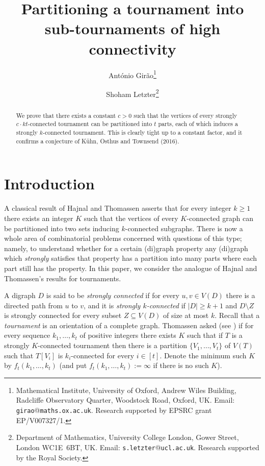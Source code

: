 \documentclass[english]{article}
\title{Partitioning a tournament into sub-tournaments of high connectivity }
\author{Ant\'onio Gir\~ao\thanks{
		Mathematical Institute, 
		University of Oxford,
		Andrew Wiles Building, 
		Radcliffe Observatory Quarter, 
		Woodstock Road,
		Oxford, UK.
		Email: \texttt{girao}@\texttt{maths.ox.ac.uk}.
		Research supported by EPSRC grant EP/V007327/1.
	}
	\and
	Shoham Letzter\thanks{
		Department of Mathematics, 
		University College London, 
		Gower Street, London WC1E~6BT, UK. 
		Email: \texttt{s.letzter}@\texttt{ucl.ac.uk}. 
		Research supported by the Royal Society.   
	}
}
\date{}
\theoremstyle{plain}
\theoremstyle{remark}
\begin{document}
\maketitle

\begin{abstract}
	\setlength{\parskip}{\medskipamount}
    \setlength{\parindent}{0pt}
    \noindent

	We prove that there exists a constant $c > 0$ such that the vertices of every strongly $c \cdot kt$-connected tournament can be partitioned into $t$ parts, each of which induces a strongly $k$-connected tournament. This is clearly tight up to a constant factor, and it confirms a conjecture of K\"uhn, Osthus and Townsend (2016).

\end{abstract}

\section{Introduction}

	A classical result of Hajnal \cite{hajnal1983partition} and Thomassen \cite{thomassen1983graph} asserts that for every integer $k \ge 1$ there exists an integer $K$ such that the vertices of every $K$-connected graph can be partitioned into two sets inducing $k$-connected subgraphs. There is now a whole area of combinatorial problems concerned with questions of this type; namely, to understand whether for a certain (di)graph property any (di)graph which \textit{strongly} satisfies that property has a partition into many parts where each part still has the property. In this paper, we consider the analogue of Hajnal and Thomassen's results for tournaments.

	A digraph $D$ is said to be \emph{strongly connected} if for every $u, v \in V(D)$ there is a directed path from $u$ to $v$, and it is \emph{strongly $k$-connected} if $|D| \ge k+1$ and $D \setminus Z$ is strongly connected for every subset $Z \subseteq V(D)$ of size at most $k$. Recall that a \emph{tournament} is an orientation of a complete graph. 
	Thomassen asked (see \cite{reid1989three}) if for every sequence $k_1, \ldots, k_t$ of positive integers there exists $K$ such that if $T$ is a strongly $K$-connected tournament then there is a partition $\{V_1, \ldots, V_t\}$ of $V(T)$ such that $T[V_i]$ is $k_i$-connected for every $i \in [t]$. Denote the minimum such $K$ by $f_t(k_1, \ldots, k_t)$ (and put $f_t(k_1, \ldots, k_t) := \infty$ if there is no such $K$).
\end{document}
